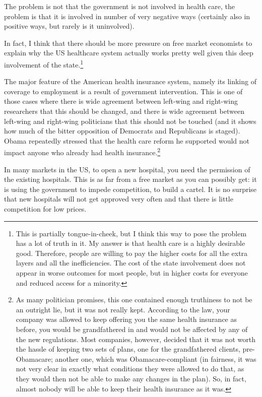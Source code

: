 The problem is not that the government is not involved in health care, the
problem is that it is involved in number of very negative ways (certainly also
in positive ways, but rarely is it uninvolved).

In fact, I think that there should be more pressure on free market economists
to explain why the US healthcare system actually works pretty well given this
deep involvement of the state.\footnote{This is partially tongue-in-cheek, but
I think this way to pose the problem has a lot of truth in it. My answer is
that health care is a highly desirable good. Therefore, people are willing to
pay the higher costs for all the extra layers and all the inefficiencies. The
cost of the state involvement does not appear in worse outcomes for most
people, but in higher costs for everyone and reduced access for a minority.}

The major feature of the American health insurance system, namely its linking
of coverage to employment is a result of government intervention. This is
one of those cases where there is wide agreement between left-wing and
right-wing researchers that this should be changed, and there is wide agreement
between left-wing and right-wing politicians that this should not be touched
(and it shows how much of the bitter opposition of Democrats and Republicans is
staged). Obama repeatedly stressed that the health care reform he supported
would not impact anyone who already had health insurance.\footnote{As many
politician promises, this one contained enough truthiness to not be an outright
lie, but it was not really kept. According to the law, your company was allowed
to keep offering you the same health insurance as before, you would be
grandfathered in and would not be affected by any of the new regulations. Most
companies, however, decided that it was not worth the hassle of keeping two
sets of plans, one for the grandfathered clients, pre-Obamacare; another one,
which was Obamacare-compliant (in fairness, it was not very clear in exactly
what conditions they were allowed to do that, as they would then not be able to
make any changes in the plan). So, in fact, almost nobody will be able to keep
their health insurance as it was.}

In many markets in the US, to open a new hospital, you need the permission of
the existing hospitals. This is as far from a free
market as you can possibly get: it is using the government to impede
competition, to build a cartel. It is no surprise that new hospitals will not
get approved very often and that there is little competition for low prices.

